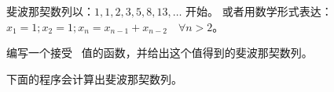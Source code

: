 \begin{Exercise}[title={斐波那契},difficulty=1]
\label{ex:fibonaci}
\Question\label{ex:fibonaci q1}
斐波那契数列以：$1, 1, 2, 3, 5, 8, 13, \ldots$ 开始。
或者用数学形式表达：$ x_1 = 1; x_2 = 1; x_n = x_{n-1} +
x_{n-2}\quad\forall n > 2 $。

编写一个接受~ 值的函数，并给出这个值得到的斐波那契数列。

\end{Exercise}

\begin{Answer}
\Question
下面的程序会计算出斐波那契数列。


\showremarks
\end{Answer}
